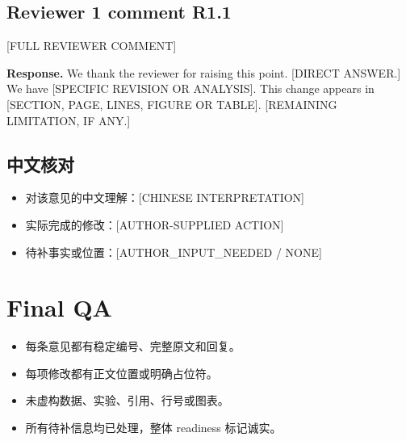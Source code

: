 \documentclass[UTF8,11pt]{ctexart}
\newcommand{\placeholder}[1]{\textcolor{aidinggreen}{[#1]}}
\newcommand{\checkbox}{\ensuremath{\square}}
\begin{document}
\subsection*{Reviewer 1 comment R1.1}
\placeholder{FULL REVIEWER COMMENT}

\textbf{Response.} We thank the reviewer for raising this point. \placeholder{DIRECT ANSWER.} We have \placeholder{SPECIFIC REVISION OR ANALYSIS}. This change appears in \placeholder{SECTION, PAGE, LINES, FIGURE OR TABLE}. \placeholder{REMAINING LIMITATION, IF ANY.}

\subsection*{中文核对}
\begin{itemize}
\item 对该意见的中文理解：\placeholder{CHINESE INTERPRETATION}
\item 实际完成的修改：\placeholder{AUTHOR-SUPPLIED ACTION}
\item 待补事实或位置：\placeholder{AUTHOR\_INPUT\_NEEDED / NONE}
\end{itemize}

\section{Final QA}
\begin{itemize}
\item[\checkbox] 每条意见都有稳定编号、完整原文和回复。
\item[\checkbox] 每项修改都有正文位置或明确占位符。
\item[\checkbox] 未虚构数据、实验、引用、行号或图表。
\item[\checkbox] 所有待补信息均已处理，整体 readiness 标记诚实。
\end{itemize}
\end{document}
